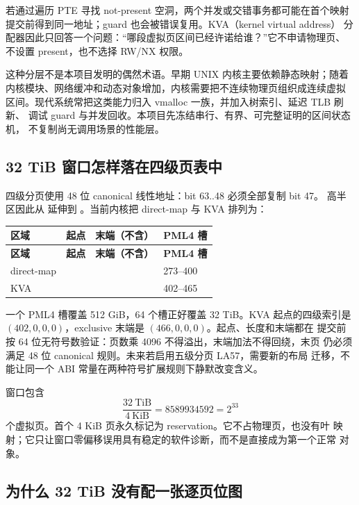 若通过遍历 PTE 寻找 not-present 空洞，两个并发或交错事务都可能在首个映射
提交前得到同一地址；guard 也会被错误复用。KVA（kernel virtual address）
分配器因此只回答一个问题：“哪段虚拟页区间已经许诺给谁？”它不申请物理页、
不设置 present，也不选择 RW/NX 权限。

这种分层不是本项目发明的偶然术语。早期 UNIX 内核主要依赖静态映射；随着
内核模块、网络缓冲和动态对象增加，内核需要把不连续物理页组织成连续虚拟
区间。现代系统常把这类能力归入 vmalloc 一族，并加入树索引、延迟 TLB 刷新、
调试 guard 与并发回收。本项目先冻结串行、有界、可完整证明的区间状态机，
不复制尚无调用场景的性能层。

\subsection{32 TiB 窗口怎样落在四级页表中}

四级分页使用 48 位 canonical 线性地址：bit 63..48 必须全部复制 bit 47。
高半区因此从  延伸到
。当前内核把 direct-map 与 KVA 排列为：

\begin{longtable}{L{0.20\textwidth}L{0.24\textwidth}L{0.24\textwidth}L{0.18\textwidth}}
\toprule
\textbf{区域} & \textbf{起点} & \textbf{末端（不含）} & \textbf{PML4 槽}\\
\midrule
\endfirsthead
\toprule
\textbf{区域} & \textbf{起点} & \textbf{末端（不含）} & \textbf{PML4 槽}\\
\midrule
\endhead
direct-map &
 &
 &
273--400\\
KVA &
 &
 &
402--465\\
\bottomrule
\end{longtable}

一个 PML4 槽覆盖 512 GiB，64 个槽正好覆盖 32 TiB。KVA 起点的四级索引是
\((402,0,0,0)\)，exclusive 末端是 \((466,0,0,0)\)。起点、长度和末端都在
提交前按 64 位无符号数验证：页数乘 4096 不得溢出，末端加法不得回绕，末页
仍必须满足 48 位 canonical 规则。未来若启用五级分页 LA57，需要新的布局
迁移，不能让同一个 ABI 常量在两种符号扩展规则下静默改变含义。

窗口包含
\[
 \frac{32\ \mathrm{TiB}}{4\ \mathrm{KiB}}
 =8589934592=2^{33}
\]
个虚拟页。首个 4 KiB 页永久标记为 reservation。它不占物理页，也没有叶
映射；它只让窗口零偏移误用具有稳定的软件诊断，而不是直接成为第一个正常
对象。

\subsection{为什么 32 TiB 没有配一张逐页位图}

